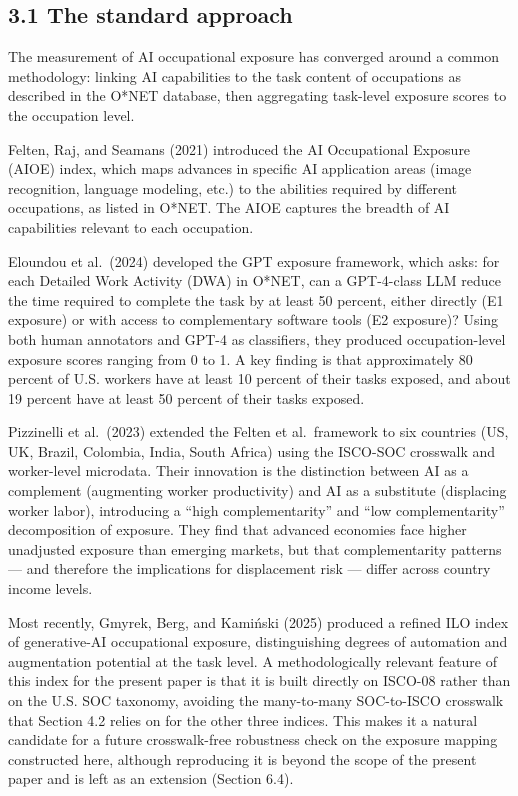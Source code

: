 \documentclass[
  11pt,
]{article}
\begin{document}
\subsection{3.1 The standard approach}\label{the-standard-approach}

The measurement of AI occupational exposure has converged around a
common methodology: linking AI capabilities to the task content of
occupations as described in the O*NET database, then aggregating
task-level exposure scores to the occupation level.

Felten, Raj, and Seamans (2021) introduced the AI Occupational Exposure
(AIOE) index, which maps advances in specific AI application areas
(image recognition, language modeling, etc.) to the abilities required
by different occupations, as listed in O*NET. The AIOE captures the
breadth of AI capabilities relevant to each occupation.

Eloundou et al.~(2024) developed the GPT exposure framework, which asks:
for each Detailed Work Activity (DWA) in O*NET, can a GPT-4-class LLM
reduce the time required to complete the task by at least 50 percent,
either directly (E1 exposure) or with access to complementary software
tools (E2 exposure)? Using both human annotators and GPT-4 as
classifiers, they produced occupation-level exposure scores ranging from
0 to 1. A key finding is that approximately 80 percent of U.S. workers
have at least 10 percent of their tasks exposed, and about 19 percent
have at least 50 percent of their tasks exposed.

Pizzinelli et al.~(2023) extended the Felten et al.~framework to six
countries (US, UK, Brazil, Colombia, India, South Africa) using the
ISCO-SOC crosswalk and worker-level microdata. Their innovation is the
distinction between AI as a complement (augmenting worker productivity)
and AI as a substitute (displacing worker labor), introducing a ``high
complementarity'' and ``low complementarity'' decomposition of exposure.
They find that advanced economies face higher unadjusted exposure than
emerging markets, but that complementarity patterns --- and therefore
the implications for displacement risk --- differ across country income
levels.

Most recently, Gmyrek, Berg, and Kamiński (2025) produced a refined ILO
index of generative-AI occupational exposure, distinguishing degrees of
automation and augmentation potential at the task level. A
methodologically relevant feature of this index for the present paper is
that it is built directly on ISCO-08 rather than on the U.S. SOC
taxonomy, avoiding the many-to-many SOC-to-ISCO crosswalk that Section
4.2 relies on for the other three indices. This makes it a natural
candidate for a future crosswalk-free robustness check on the exposure
mapping constructed here, although reproducing it is beyond the scope of
the present paper and is left as an extension (Section 6.4).
\end{document}

